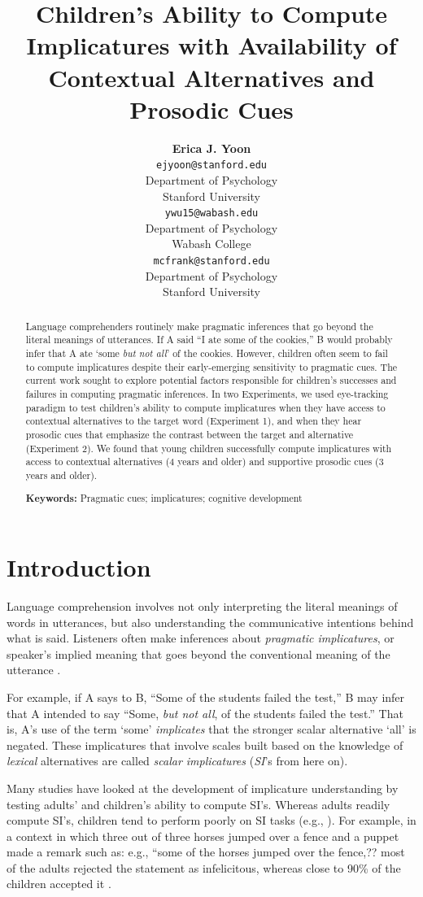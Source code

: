 \documentclass[10pt,letterpaper]{article}
\title{Children's Ability to Compute Implicatures \linebreak with Availability of Contextual Alternatives and Prosodic Cues}
\author{{\large \bf Erica J. Yoon} \\ \texttt{ejyoon@stanford.edu} \\
  Department of Psychology \\
  Stanford University
  \And {\large \bf Charles Y. Wu} \\ \texttt{ywu15@wabash.edu} \\
  Department of Psychology \\
  Wabash College
  \And {\large \bf Michael C. Frank} \\ \texttt{mcfrank@stanford.edu} \\
  Department of Psychology \\
  Stanford University}
\begin{document}
\maketitle


\begin{abstract}
Language comprehenders routinely make pragmatic inferences that go beyond the literal meanings of utterances. If A said ``I ate some of the cookies,'' B would probably infer that A ate `some \emph{but not all}' of the cookies. However, children often seem to fail to compute implicatures despite their early-emerging sensitivity to pragmatic cues. The current work sought to explore potential factors responsible for children's successes and failures in computing pragmatic inferences. In two Experiments, we used eye-tracking paradigm to test children's ability to compute implicatures when they have access to contextual alternatives to the target word (Experiment 1), and when they hear prosodic cues that emphasize the contrast between the target and alternative (Experiment 2). We found that young children successfully compute implicatures with access to contextual alternatives (4 years and older) and supportive prosodic cues (3 years and older). 

\textbf{Keywords:} 
Pragmatic cues; implicatures; cognitive development

\end{abstract}


\section{Introduction}

Language comprehension involves not only interpreting the literal meanings of words in utterances, but also understanding the communicative intentions behind what is said. Listeners often make inferences about \emph{pragmatic implicatures}, or speaker's implied meaning that goes beyond the conventional meaning of the utterance \cite{grice1975logic}. 

For example, if A says to B, ``Some of the students failed the test,'' B may infer that A intended to say ``Some, \emph{but not all}, of the students failed the test.'' That is, A's use of the term `some' \emph{implicates} that the stronger scalar alternative `all' is negated. These implicatures that involve scales built based on the knowledge of \emph{lexical} alternatives are called \emph{scalar implicatures} (\emph{SI}'s from here on).

Many studies have looked at the development of implicature understanding by testing adults' and children's ability to compute SI's. Whereas adults readily compute SI's, children tend to perform poorly on SI tasks (e.g., ). For example, in a context in which three out of three horses jumped over a fence and a puppet made a remark such as: e.g., ``some of the horses jumped over the fence,?? most of the adults rejected the statement as infelicitous, whereas close to 90\% of the children accepted it \cite{papafragou2003scalar}. %
\end{document}
